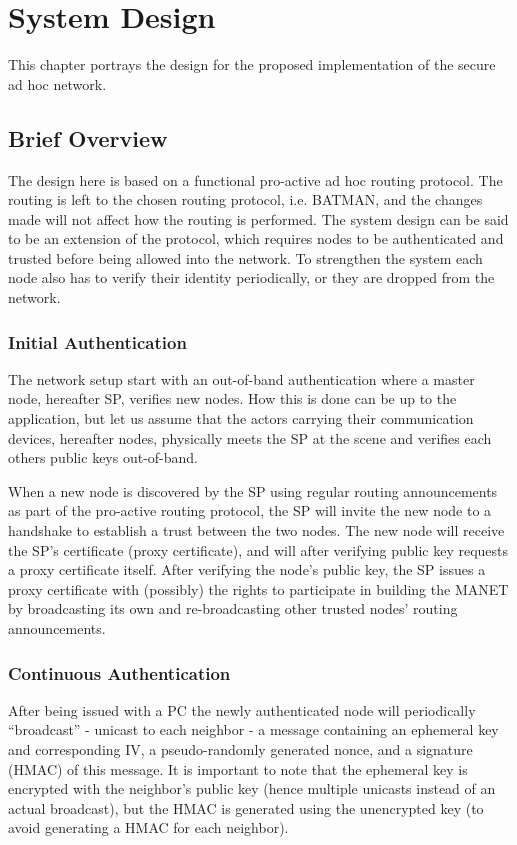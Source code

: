 \chapter{System Design}
\label{ch:design}
\acresetall

This chapter portrays the design for the proposed implementation of the secure
ad hoc network.

\section{Brief Overview}
The design here is based on a functional pro-active ad hoc routing protocol. The
routing is left to the chosen routing protocol, i.e. \ac{BATMAN}, and the
changes made will not affect how the routing is performed. The system design can
be said to be an extension of the protocol, which requires nodes to be
authenticated and trusted before being allowed into the network. To strengthen
the system each node also has to verify their identity periodically, or they are
dropped from the network.


\subsection{Initial Authentication}
The network setup start with an out-of-band authentication where a master node,
hereafter \ac{SP}, verifies new nodes. How this is done can be up to the
application, but let us assume that the actors carrying their communication
devices, hereafter nodes, physically meets the \ac{SP} at the scene and verifies
each others public keys out-of-band.

When a new node is discovered by the \ac{SP} using regular routing announcements
as part of the pro-active routing protocol, the \ac{SP} will invite the new node
to a handshake to establish a trust between the two nodes. The new node will
receive the \ac{SP}'s certificate (proxy certificate), and will after verifying
public key requests a proxy certificate itself. After verifying the node's
public key, the \ac{SP} issues a proxy certificate with (possibly) the rights to
participate in building the \ac{MANET} by broadcasting its own and
re-broadcasting other trusted nodes' routing announcements.

\subsection{Continuous Authentication}
After being issued with a \ac{PC} the newly authenticated node will periodically
``broadcast'' - unicast to each neighbor - a message containing an ephemeral key
and corresponding IV, a pseudo-randomly generated nonce, and a signature (HMAC)
of this message. It is important to note that the ephemeral key is encrypted
with the neighbor's public key (hence multiple unicasts instead of an actual
broadcast), but the HMAC is generated using the unencrypted key (to avoid
generating a HMAC for each neighbor).

